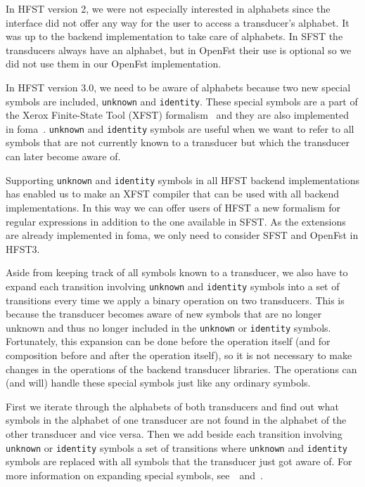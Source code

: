 \documentclass{llncs}
\begin{document}
In HFST version 2, we were not especially interested in alphabets 
since the interface did not offer any way for the user to access a 
transducer's alphabet. It was up to the backend implementation to take
care of alphabets. In SFST the transducers always have an alphabet,
but in OpenFst their use is optional so we did not use them in our
OpenFst implementation.

In HFST version 3.0, we need to be aware of alphabets because two new
special symbols are included, \texttt{unknown} and \texttt{identity}. 
These special symbols are a part of the Xerox Finite-State Tool (XFST) 
formalism~\cite[page x]{beesley/2003} and they are also implemented in
foma~\cite{hulden/2009}. \texttt{unknown} and \texttt{identity} symbols 
are useful when we want to refer to all symbols that are not currently 
known to a transducer but which the transducer can later become aware of. 

Supporting \texttt{unknown} and \texttt{identity} symbols in all HFST backend
implementations has enabled us to make an XFST compiler that can be used
with all backend implementations. 
In this way we can offer users of HFST a new 
formalism for regular expressions in addition to the one available in SFST. 
As the extensions are already implemented in foma, we only need to 
consider SFST and OpenFst in HFST3.

Aside from keeping track of all symbols known to a transducer, we also
have to expand each transition involving \texttt{unknown} and 
\texttt{identity} symbols into a set of transitions every time we apply 
a binary operation on two transducers. 
This is because the transducer becomes aware of new symbols that are
no longer unknown and thus no longer included in the \texttt{unknown} or 
\texttt{identity} symbols.
Fortunately, this expansion can be done before the operation itself 
(and for composition before and after the operation itself), so it is  
not necessary to make changes in the operations of the backend transducer
libraries. 
The operations can (and will) handle these special symbols just
like any ordinary symbols. 

First we iterate through the alphabets of both transducers and find
out what symbols in the alphabet of one transducer are not found in
the alphabet of the other transducer and vice versa. 
Then we add beside each transition involving \texttt{unknown} or 
\texttt{identity} symbols a set of transitions where \texttt{unknown} 
and \texttt{identity} symbols are
replaced with all symbols that the transducer just got aware of. 
For more information on expanding special symbols, 
see~\cite{hulden/2009}~and~\cite{beesley/2003}.
\end{document}
